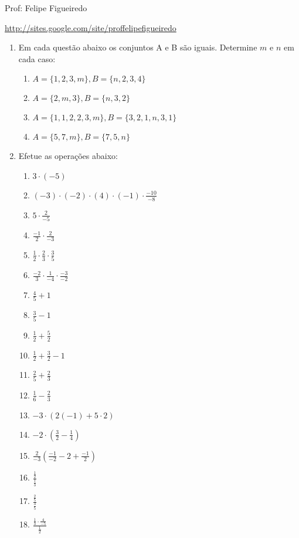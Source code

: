 \documentclass[a4paper]{article}
\begin{document}
\parbox[c]{.825\textwidth}{\raggedright%
{Prof: Felipe Figueiredo\par}
{\url{http://sites.google.com/site/proffelipefigueiredo}}

\vspace{1cm}
}


\begin{enumerate}
\section{Exercícios}

\item Em cada questão abaixo os conjuntos A e B são iguais. Determine
  $m$ e $n$ em cada caso:
  \begin{enumerate}
  \item $A = \{1,2,3,m\}, B = \{n,2,3,4\}$
  \item $A = \{2,m,3\}, B = \{n,3,2\}$
  \item $A = \{1,1,2,2,3,m\}, B = \{3,2,1,n,3,1\}$
  \item $A = \{5,7,m\}, B = \{7,5,n\}$
  \end{enumerate}

\item Efetue as operações abaixo:
  \begin{enumerate}
  \item $3 \cdot (-5)$
  \item $(-3)\cdot(-2)\cdot(4)\cdot(-1)\cdot\frac{-10}{-8}$
  \item $5 \cdot \frac{2}{-5}$
  \item $\frac{-1}{2}\cdot\frac{2}{-3}$
  \item $\frac{1}{2}\cdot\frac{2}{3}\cdot\frac{3}{5}$
  \item $\frac{-2}{3}\cdot\frac{1}{-4}\cdot\frac{-3}{-2}$
  \item $\frac{4}{5} + 1$
  \item $\frac{3}{5} - 1$
  \item $\frac{1}{2} + \frac{5}{2}$
  \item $\frac{1}{2} + \frac{3}{2} - 1$
  \item $\frac{2}{5} + \frac{2}{3}$
  \item $\frac{1}{6} - \frac{2}{3}$
  \item $-3\cdot\left( 2 (-1) + 5 \cdot 2  \right)$
  \item $-2 \cdot \left( \frac{3}{2} - \frac{1}{4} \right)$
  \item $\frac{2}{-3}\left( \frac{-1}{-2} - 2 + \frac{-1}{2}  \right)$
  \item $\frac{\frac{1}{2}}{\frac{1}{3}}$
  \item $\frac{\frac{2}{5}}{\frac{3}{5}}$
  \item $\frac{\frac{1}{3} \cdot \frac{4}{-5}}{\frac{1}{2}}$
  \end{enumerate}


\end{enumerate}
\end{document}
